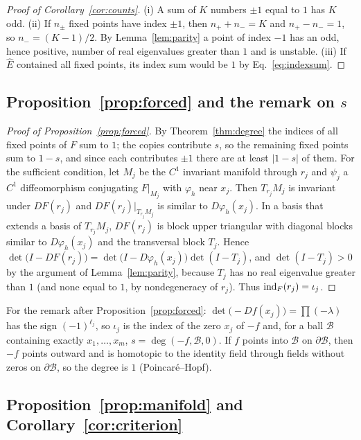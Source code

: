 \begin{proof}[Proof of Corollary~\ref{cor:counts}]
(i) A sum of $K$ numbers $\pm1$ equal to $1$ has $K$ odd. (ii) If $n_\pm$ fixed points have index $\pm1$, then
$n_++n_-=K$ and $n_+-n_-=1$, so $n_-=(K-1)/2$. By Lemma~\ref{lem:parity} a point of index $-1$ has an odd, hence positive,
number of real eigenvalues greater than $1$ and is unstable. (iii) If $\hat E$ contained all fixed points, its index sum
would be $1$ by Eq.~\eqref{eq:indexsum}.
\end{proof}

\subsection{Proposition~\ref{prop:forced} and the remark on $s$}

\begin{proof}[Proof of Proposition~\ref{prop:forced}]
By Theorem~\ref{thm:degree} the indices of all fixed points of $F$ sum to $1$; the copies contribute $s$, so the remaining
fixed points sum to $1-s$, and since each contributes $\pm1$ there are at least $|1-s|$ of them. For the sufficient
condition, let $M_j$ be the $C^1$ invariant manifold through $r_j$ and $\psi_j$ a $C^1$ diffeomorphism conjugating
$F|_{M_j}$ with $\varphi_h$ near $x_j$. Then $T_{r_j}M_j$ is invariant under $DF(r_j)$ and $DF(r_j)|_{T_{r_j}M_j}$ is similar
to $D\varphi_h(x_j)$. In a basis that extends a basis of $T_{r_j}M_j$, $DF(r_j)$ is block upper triangular with diagonal
blocks similar to $D\varphi_h(x_j)$ and the transversal block $T_j$. Hence
$\det\bigl(I-DF(r_j)\bigr)=\det\bigl(I-D\varphi_h(x_j)\bigr)\det(I-T_j)$, and $\det(I-T_j)>0$ by the argument of
Lemma~\ref{lem:parity}, because $T_j$ has no real eigenvalue greater than $1$ (and none equal to $1$, by nondegeneracy of
$r_j$). Thus $\operatorname{ind}_F(r_j)=\iota_j$.
\end{proof}

For the remark after Proposition~\ref{prop:forced}: $\det\bigl(-Df(x_j)\bigr)=\prod(-\lambda)$ has the sign $(-1)^{\ell_j}$, so
$\iota_j$ is the index of the zero $x_j$ of $-f$ and, for a ball $\mathcal{B}$ containing exactly $x_1,\dots,x_m$,
$s=\deg(-f,\mathcal{B},0)$. If $f$ points into $\mathcal{B}$ on $\partial\mathcal{B}$, then $-f$ points outward and is
homotopic to the identity field through fields without zeros on $\partial\mathcal{B}$, so the degree is $1$
(Poincar\'e--Hopf).

\subsection{Proposition~\ref{prop:manifold} and Corollary~\ref{cor:criterion}}

